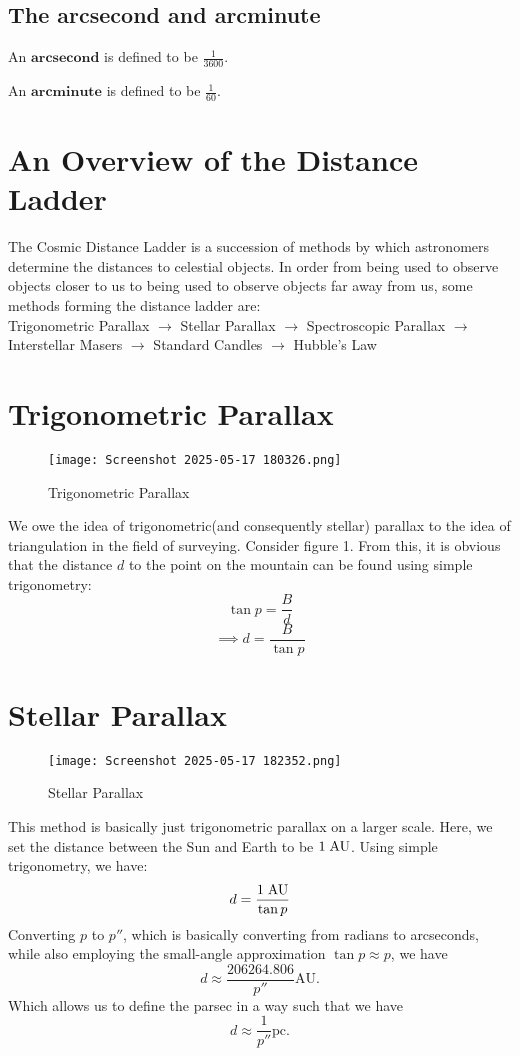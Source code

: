 \documentclass{article}
\theoremstyle{definition}
\begin{document}
\subsection{The arcsecond and arcminute}
\begin{definition}
    An $\textbf{arcsecond}$ is defined to be $\frac{1}{3600}$\textdegree.
\end{definition}
\begin{definition}
    An $\textbf{arcminute}$ is defined to be $\frac{1}{60}$\textdegree.
\end{definition}
\section{An Overview of the Distance Ladder}
The Cosmic Distance Ladder is a succession of methods by which astronomers determine the distances to celestial objects. In order from being used to observe objects closer to us to being used to observe objects far away from us, some methods forming the distance ladder are:\\
Trigonometric Parallax $\rightarrow$ Stellar Parallax $\rightarrow$ Spectroscopic Parallax $\rightarrow$ Interstellar Masers $\rightarrow$ Standard Candles $\rightarrow$ Hubble's Law

\section{Trigonometric Parallax}
\begin{figure}[H]
    \centering
    \texttt{[image: Screenshot 2025-05-17 180326.png]}
    \caption{Trigonometric Parallax}
\end{figure}
We owe the idea of trigonometric(and consequently stellar) parallax to the idea of triangulation in the field of surveying. Consider figure 1. From this, it is obvious that the distance $d$ to the point on the mountain can be found using simple trigonometry:
$$\tan p=\frac{B}{d}$$
$$\implies d=\frac{B}{\tan p}$$
\section{Stellar Parallax}
\begin{figure}[H]
    \centering
    \texttt{[image: Screenshot 2025-05-17 182352.png]}
    \caption{Stellar Parallax}
\end{figure}
This method is basically just trigonometric parallax on a larger scale. Here, we set the distance between the Sun and Earth to be $1\hspace{0.1cm}\text{AU}$. Using simple trigonometry, we have:
$$d=\frac{1\hspace{0.1cm}\text{AU}}{\tan p}$$
Converting $p$ to $p''$, which is basically converting from radians to arcseconds, while also employing the small-angle approximation $\tan p\approx p$, we have
$$d\approx \frac{206264.806}{p''}\text{AU.}$$
Which allows us to define the parsec in a way such that we have
$$d\approx\frac{1}{p''}\text{pc.}$$
\newpage
\end{document}
